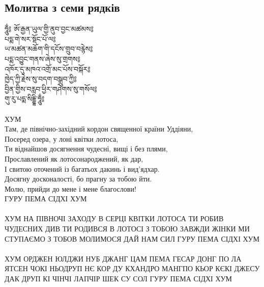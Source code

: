 \subsection{Молитва з семи рядків}
\vspace{0.5cm}
\ti
ཧཱུྂ༔ ཨོ་རྒྱན་ཡུལ་གྱི་ནུབ་བྱང་མཚམས༔\\
པདྨ་གེ་སར་སྡོང་པོ་ལ༔\\
ཡ་མཚན་མཆོག་གི་དངོས་གྲུབ་བརྙེས༔\\
པདྨ་འབྱུང་གནས་ཞེས་སུ་གྲགས༔\\
འཁོར་དུ་མཁའ་འགྲོ་མང་པོས་བསྐོར༔\\
ཁྱེད་ཀྱི་རྗེས་སུ་བདག་བསྒྲུབ་ཀྱི༔\\
བྱིན་གྱིས་བརླབ་ཕྱིར་གཤེགས་སུ་གསོལ༔\\
གུ་རུ་པདྨ་སིདྡྷི་ཧཱུྂ༔\\
\\
\ru
ХУМ \\
Там, де північно-західний кордон священної країни Уддіяни,\\
Посеред озера, у лоні квітки лотоса,\\
Ти віднайшов досягнення чудесні, вищі і без плями,\\
Прославлений як лотосонароджений, як дар,\\
І свитою оточений із багатьох дакинь і вид'ядхар.\\
Досягну досконалості, бо прагну за тобою йти.\\
Молю, прийди до мене і мене благослови!\\
ГУРУ ПЕМА СІДХІ ХУМ \\
\\
ХУМ НА ПІВНОЧІ ЗАХОДУ
В СЕРЦІ КВІТКИ ЛОТОСА
ТИ РОБИВ ЧУДЕСНИХ ДИВ
ТИ РОДИВСЯ В ЛОТОСІ
З ТОБОЮ ЗАВЖДИ ЖІНКИ
МИ СТУПАЄМО З ТОБОВ
МОЛИМОСЯ ДАЙ НАМ СИЛ
ГУРУ ПЕМА СІДХІ ХУМ \\
\\
ХУМ ОРДЖЕН ЮЛДЖИ НУБ ДЖАНГ ЦАМ
ПЕМА ГЕСАР ДОНГ ПО ЛА
ЯТСЕН ЧОКІ НЬОДРУП НЄ
КОР ДУ КХАНДРО МАНГПО КЬОР
КЄКІ ДЖЕСУ ДАК ДРУП КІ
ЧІНЧІ ЛАПЧІР ШЕК СУ СОЛ
ГУРУ ПЕМА СІДХІ ХУМ

\newpage
